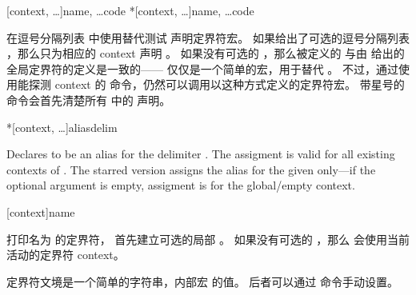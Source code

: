 \begin{ltxsyntax}
[context, \dots]{name, \dots}{code}
*[context, \dots]{name, \dots}{code}


在逗号分隔列表  中使用替代测试  声明定界符宏。
如果给出了可选的逗号分隔列表 ，那么只为相应的 context 声明 。
如果没有可选的 ，那么被定义的  与由  给出的全局定界符的定义是一致的——
仅仅是一个简单的宏，用于替代 。
不过，通过使用能探测 context 的  命令，仍然可以调用以这种方式定义的定界符宏。
带星号的命令会首先清楚所有  中的  声明。

*[context, \dots]{alias}{delim}

Declares  to be an alias for the delimiter . The assigment is valid for all existing contexts of .
The starred version assigns the alias for the given  only---if the optional argument is empty, assigment is for the global/empty context.


[context]{name}


打印名为  的定界符，
首先建立可选的局部 。
如果没有可选的 ，那么  会使用当前活动的定界符 context。


定界符文境是一个简单的字符串，内部宏  的值。
后者可以通过  命令手动设置。


\end{ltxsyntax}
